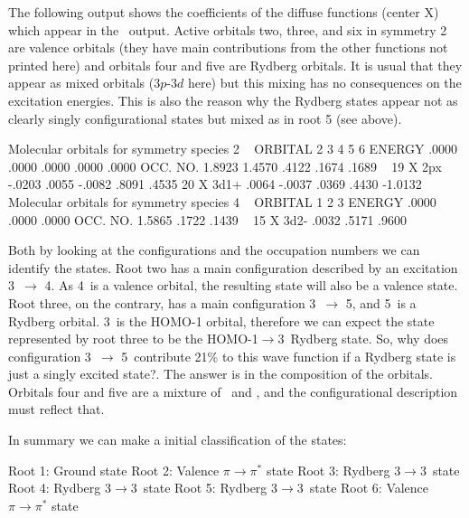 The following output shows the coefficients of the diffuse functions
(center X) which appear in the \molcas\ output. 
Active orbitals two, three, and six in symmetry 2 are valence orbitals
(they have main contributions from the other functions not printed
here) and orbitals four and five are Rydberg orbitals. It is usual
that they appear as mixed orbitals (3$p$-3$d$ here) but this mixing has no
consequences on the excitation energies. This is also the reason why 
the Rydberg states appear not as clearly singly configurational
states but mixed as in root 5 (see above). 


\begin{sourcelisting}
   Molecular orbitals for symmetry species 2
~
   ORBITAL       2        3        4        5        6
   ENERGY      .0000    .0000    .0000    .0000    .0000
   OCC. NO.   1.8923   1.4570    .4122    .1674    .1689
~
19 X  2px     -.0203    .0055   -.0082	  .8091    .4535   
20 X  3d1+     .0064   -.0037	 .0369    .4430  -1.0132  
~
   Molecular orbitals for symmetry species 4
~
   ORBITAL       1        2        3    
   ENERGY      .0000    .0000    .0000   
   OCC. NO.   1.5865    .1722    .1439 
~
15 X  3d2-     .0032    .5171    .9600	
\end{sourcelisting}

Both by looking at the configurations and the occupation numbers
we can identify the states. Root two has a main configuration described
by an excitation 3\bo\ $\to$ 4\bo. As 4\bo\ is a valence orbital,
the resulting state will also be a valence state. Root three, on the
contrary, has a main configuration 3\bo\ $\to$ 5\bo, and 5\bo\ is a
Rydberg orbital. 3\bo\ is the HOMO-1 orbital, therefore we can expect the
state represented by root three to be the HOMO-1$\to$3\px\ Rydberg
state. So, why does configuration 3\bo\ $\to$ 5\bo\ contribute 21\% to this 
wave function
if a Rydberg state is just a singly excited state?. The answer is in the
composition of the orbitals. Orbitals four and five are a mixture
of \px\ and \dxz, and the configurational description must reflect that.

In summary we can make a initial classification of the states:


Root 1: Ground state \newline
Root 2: Valence $\pi\to\pi^*$  state\newline
Root 3: Rydberg 3\bo$\to$3\px\ state\newline
Root 4: Rydberg 3\at$\to$3\dxy\ state\newline
Root 5: Rydberg 3\bo$\to$3\dxz\ state\newline
Root 6: Valence $\pi\to\pi^*$  state

